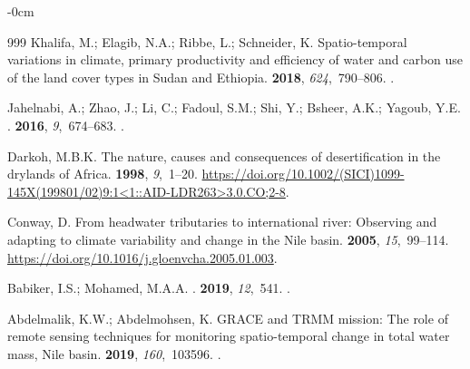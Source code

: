 \documentclass[jimaging,article,accept,pdftex,moreauthors]{Definitions/mdpi}
\begin{document}
\begin{adjustwidth}{-\extralength}{0cm}
\begin{thebibliography}{999}
Khalifa, M.; Elagib, N.A.; Ribbe, L.; Schneider, K.
\newblock Spatio-temporal variations in climate, primary productivity and
  efficiency of water and carbon use of the land cover types in Sudan and
  Ethiopia.
 {\bf 2018}, {\em
  624},~790--806.
.

Jahelnabi, A.; Zhao, J.; Li, C.; Fadoul, S.M.; Shi, Y.; Bsheer, A.K.; Yagoub,
  Y.E.
.
 {\bf 2016}, {\em 9},~674--683.
.

Darkoh, M.B.K.
\newblock The nature, causes and consequences of desertification in the
  drylands of Africa.
 {\bf 1998}, {\em 9},~1--20.
\newblock
  {\url{https://doi.org/10.1002/(SICI)1099-145X(199801/02)9:1<1::AID-LDR263>3.0.CO;2-8}}.

Conway, D.
\newblock From headwater tributaries to international river: Observing and
  adapting to climate variability and change in the Nile basin.
 {\bf 2005}, {\em 15},~99--114.
  {\url{https://doi.org/10.1016/j.gloenvcha.2005.01.003}}.

Babiker, I.S.; Mohamed, M.A.A.
.
 {\bf 2019}, {\em 12},~541.
.

Abdelmalik, K.W.; Abdelmohsen, K.
\newblock GRACE and TRMM mission: The role of remote sensing techniques for
  monitoring spatio-temporal change in total water mass, Nile basin.
 {\bf 2019}, {\em
  160},~103596.
.


\end{thebibliography}
\end{adjustwidth}
\end{document}
